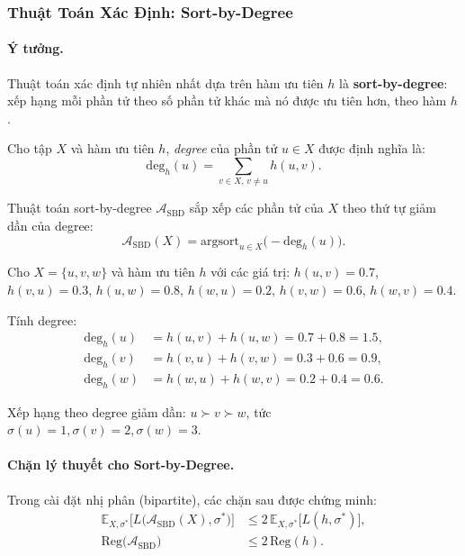 \subsubsection{Thuật Toán Xác Định: Sort-by-Degree}
\label{sec:sort_by_degree}

\paragraph{Ý tưởng.} Thuật toán xác định tự nhiên nhất dựa trên hàm ưu tiên $h$ là \textbf{sort-by-degree}: xếp hạng mỗi phần tử theo số phần tử khác mà nó được ưu tiên hơn, theo hàm $h$.

\begin{definition}
Cho tập $X$ và hàm ưu tiên $h$, \emph{degree} của phần tử $u \in X$ được định nghĩa là:
\begin{equation}
    \mathrm{deg}_h(u) = \sum_{v \in X,\, v \neq u} h(u, v).
    \label{eq:degree}
\end{equation}
\end{definition}

Thuật toán sort-by-degree $\mathcal{A}_{\text{SBD}}$ sắp xếp các phần tử của $X$ theo thứ tự giảm dần của degree:
\[
    \mathcal{A}_{\text{SBD}}(X) = \text{argsort}_{u \in X}\bigl(-\mathrm{deg}_h(u)\bigr).
\]

\begin{example}
Cho $X = \{u, v, w\}$ và hàm ưu tiên $h$ với các giá trị:
$h(u,v) = 0.7$, $h(v,u) = 0.3$, $h(u,w) = 0.8$, $h(w,u) = 0.2$, $h(v,w) = 0.6$, $h(w,v) = 0.4$.

Tính degree:
\begin{align*}
    \mathrm{deg}_h(u) &= h(u,v) + h(u,w) = 0.7 + 0.8 = 1.5, \\
    \mathrm{deg}_h(v) &= h(v,u) + h(v,w) = 0.3 + 0.6 = 0.9, \\
    \mathrm{deg}_h(w) &= h(w,u) + h(w,v) = 0.2 + 0.4 = 0.6.
\end{align*}

Xếp hạng theo degree giảm dần: $u \succ v \succ w$, tức $\sigma(u)=1, \sigma(v)=2, \sigma(w)=3$.
\end{example}

\paragraph{Chặn lý thuyết cho Sort-by-Degree.}
\begin{theorem}
\label{thm:sort_by_degree}
Trong cài đặt nhị phân (bipartite), các chặn sau được chứng minh:
\begin{align}
    \mathbb{E}_{X, \sigma^*}\bigl[L\bigl(\mathcal{A}_{\mathrm{SBD}}(X), \sigma^*\bigr)\bigr] &\leq 2\, \mathbb{E}_{X, \sigma^*}\bigl[L(h, \sigma^*)\bigr], \label{eq:sbd_loss} \\
    \mathrm{Reg}\bigl(\mathcal{A}_{\mathrm{SBD}}\bigr) &\leq 2\, \mathrm{Reg}(h). \label{eq:sbd_regret}
\end{align}
\end{theorem}

